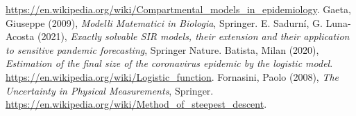 \cleardoublepage
{}
{}
\begin{thebibliography}{9}
 \url{https://en.wikipedia.org/wiki/Compartmental_models_in_epidemiology}.
 Gaeta, Giuseppe (2009), \emph{Modelli Matematici in Biologia}, Springer.
 E. Sadurní, G. Luna-Acosta (2021), \emph{Exactly solvable SIR models, their extension and their application to sensitive pandemic forecasting}, Springer Nature.
 Batista, Milan (2020), \emph{Estimation of the final size of the coronavirus epidemic by the logistic model}.
 \url{https://en.wikipedia.org/wiki/Logistic_function}.
 Fornasini, Paolo (2008), \emph{The Uncertainty in Physical Measurements}, Springer.
 \url{https://en.wikipedia.org/wiki/Method_of_steepest_descent}.
\end{thebibliography}